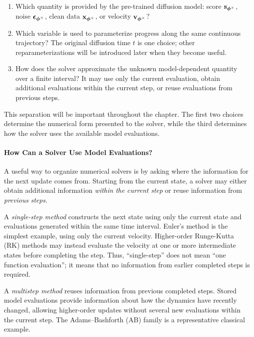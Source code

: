 \begin{enumerate}
    \item {}
    Which quantity is provided by the pre-trained diffusion model:
    score ${\mathbf{s}}_{\bm{\phi}^\times}$, noise
    ${\bm{\epsilon}}_{\bm{\phi}^\times}$, clean data
    ${\mathbf{x}}_{\bm{\phi}^\times}$, or velocity
    ${\mathbf{v}}_{\bm{\phi}^\times}$?

    \item {}
    Which variable is used to parameterize progress along the same continuous
    trajectory? The original diffusion time $t$ is one choice; other
    reparameterizations will be introduced later when they become useful.

    \item {}
    How does the solver approximate the unknown model-dependent quantity over
    a finite interval? It may use only the current evaluation, obtain
    additional evaluations within the current step, or reuse evaluations from
    previous steps.
\end{enumerate}
This separation will be important throughout the chapter. The first two
choices determine the numerical form presented to the solver, while the third
determines how the solver uses the available model evaluations.




\paragraph{How Can a Solver Use Model Evaluations?}
A useful way to organize numerical solvers is by asking where the information
for the next update comes from. Starting from the current state, a solver may
either obtain additional information \emph{within the current step} or reuse
information from \emph{previous steps}.

A \emph{single-step method} constructs the next state using only the current
state and evaluations generated within the same time interval. Euler's method
is the simplest example, using only the current velocity. Higher-order
Runge-Kutta (RK) methods may instead evaluate the velocity at one or more
intermediate states before completing the step. Thus, ``single-step'' does not
mean ``one function evaluation''; it means that no information from earlier
completed steps is required.

A \emph{multistep method} reuses information from previous completed steps.
Stored model evaluations provide information about how the dynamics have
recently changed, allowing higher-order updates without several new evaluations
within the current step. The Adams--Bashforth (AB) family is a representative
classical example.

